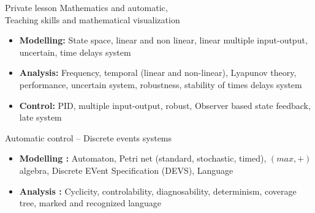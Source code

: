 \documentclass[11pt,a4paper,sans]{moderncv}        %
\newcommand{\myitem}{\textbullet}
\begin{document}
\begin{samepage}
\begin{minipage}[t]{.51\textwidth}
%
{Private lesson}%
{Mathematics and automatic, \\
Teaching skills and mathematical visualization}%
\end{minipage}%
\vspace*{-5mm}%
%
{%
{\begin{itemize}[label=\myitem]%
\item \textbf{Modelling: }%
 {\small State space, linear and non linear, linear multiple input-output, uncertain, time delays system}%
% 
\item \textbf{Analysis: }%
{\small Frequency, temporal (linear and non-linear), Lyapunov theory, performance, uncertain system, robustness, stability of times delays system}%
\item \textbf{Control: }%
{\small PID, multiple input-output, robust, Observer based state feedback, late system}%
\end{itemize}}}%
{Automatic control -- Discrete events systems}%
{{\begin{itemize}[label=\myitem]%
		\item \textbf{Modelling : }%
		{\small Automaton, Petri net (standard, stochastic, timed), %
		$(max,+)$ algebra, %
		Discrete EVent Specification (DEVS), %
		Language}%
		\item \textbf{Analysis : }%
		{\small Cyclicity, controlability, diagnosability, determinism, coverage tree, marked and recognized language}

\end{itemize}}}
\end{samepage}
\end{document}
